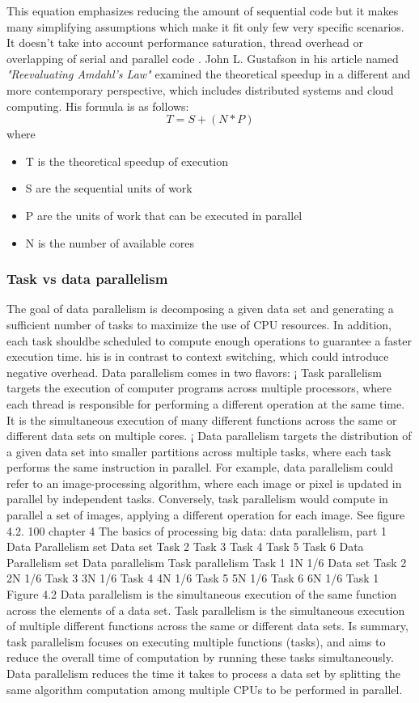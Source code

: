 This equation emphasizes reducing the amount of sequential code but it makes many simplifying assumptions which make it fit only few very specific scenarios. It doesn't take into account performance saturation, thread overhead or overlapping of serial and parallel code \cite{Popov2010}.
John L. Gustafson in his article named \emph{"Reevaluating Amdahl's Law"} \cite{Gustafson1988} examined the theoretical speedup in a different and more contemporary perspective, which includes distributed systems and cloud computing. His formula is as follows: 
\begin{equation}
T = S + (N*P)
\end{equation}
where
\begin{itemize}
	\item T is the theoretical speedup of execution
	\item S are the sequential units of work
	\item P are the units of work that can be executed in parallel
	\item N is the number of available cores
\end{itemize}
\subsubsection{Task vs data parallelism}
The goal of data parallelism is decomposing a given data set and generating a sufficient number of tasks to maximize the use of CPU resources. In addition, each task shouldbe scheduled to compute enough operations to guarantee a faster execution time.
his is in contrast to context switching, which could introduce negative overhead.
Data parallelism comes in two flavors:
¡ Task parallelism targets the execution of computer programs across multiple processors,
where each thread is responsible for performing a different operation
at the same time. It is the simultaneous execution of many different functions
across the same or different data sets on multiple cores.
¡ Data parallelism targets the distribution of a given data set into smaller partitions
across multiple tasks, where each task performs the same instruction in parallel.
For example, data parallelism could refer to an image-processing algorithm,
where each image or pixel is updated in parallel by independent tasks. Conversely,
task parallelism would compute in parallel a set of images, applying a
different operation for each image. See figure 4.2.
100 chapter 4 The basics of processing big data: data parallelism, part 1
Data
Parallelism set
Data
set
Task 2
Task 3
Task 4
Task 5
Task 6
Data
Parallelism set
Data parallelism Task parallelism
Task 1
1N 1/6
Data
set
Task 2
2N 1/6
Task 3
3N 1/6
Task 4
4N 1/6
Task 5
5N 1/6
Task 6
6N 1/6
Task 1
Figure 4.2 Data parallelism is the simultaneous execution of the same function across the elements
of a data set. Task parallelism is the simultaneous execution of multiple different functions across the
same or different data sets.
Is summary, task parallelism focuses on executing multiple functions (tasks), and aims
to reduce the overall time of computation by running these tasks simultaneously. Data
parallelism reduces the time it takes to process a data set by splitting the same algorithm
computation among multiple CPUs to be performed in parallel.

